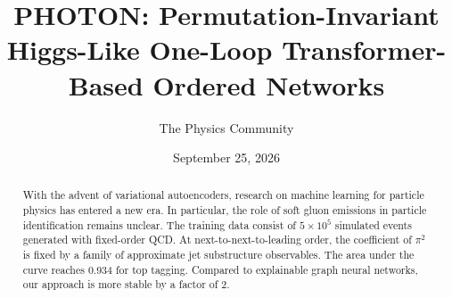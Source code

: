 \documentclass[11pt]{article}
\title{PHOTON: Permutation-Invariant Higgs-Like One-Loop Transformer-Based Ordered Networks}
\author{The Physics Community}
\date{September 25, 2026}
\begin{document}
\maketitle
\begin{abstract}
With the advent of variational autoencoders, research on machine
learning for particle physics has entered a new era. In particular, the
role of soft gluon emissions in particle identification remains unclear.
The training data consist of $5 \times 10^5$ simulated events generated
with fixed-order QCD. At next-to-next-to-leading order, the coefficient
of $\pi^2$ is fixed by a family of approximate jet substructure
observables. The area under the curve reaches 0.934 for top tagging.
Compared to explainable graph neural networks, our approach is more
stable by a factor of 2.
\end{abstract}
\tableofcontents






\nocite{*}


\end{document}

